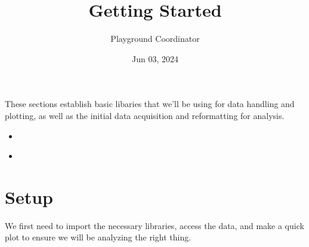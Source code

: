 \documentclass[letterpaper,10pt,english]{jupyterBook}
\title{Getting Started}
\date{Jun 03, 2024}
\author{Playground Coordinator}
\begin{document}
\pagestyle{empty}
\sphinxmaketitle
\pagestyle{plain}
\sphinxtableofcontents
\pagestyle{normal}
\label{\detokenize{gettingStarted::doc}}


\sphinxAtStartPar
These sections establish basic libaries that we’ll be using for data handling and plotting, as well as the initial data acquisition and reformatting for analysis.
\begin{itemize}
\item {} 
\sphinxAtStartPar
{\hyperref[\detokenize{notebooks/setup::doc}]{}}

\item {} 
\sphinxAtStartPar
{\hyperref[\detokenize{notebooks/SL_Data_Wrangling::doc}]{}}

\end{itemize}

\sphinxstepscope


\part{Setup}
\label{\detokenize{notebooks/setup:setup}}\label{\detokenize{notebooks/setup::doc}}
\sphinxAtStartPar
We first need to import the necessary libraries, access the data, and make a quick plot to ensure we will be analyzing the right thing.
\end{document}
